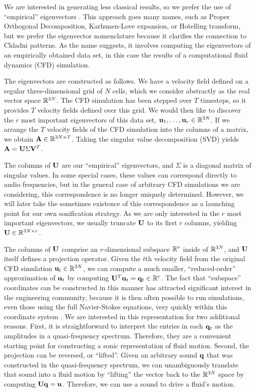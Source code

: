 \documentclass[11pt]{article}
\begin{document}
We are interested in generating less classical results, so we prefer the use of ``empirical'' eigenvectors \cite{Ryckelynck2005}. This approach goes many names, such as Proper Orthogonal Decomposition, Karhunen-Love expansion, or Hotelling transform, but we prefer the eigenvector nomenclature because it clarifies the connection to Chladni patterns. As the name suggests, it involves computing the eigenvectors of an empirically obtained data set, in this case the results of a computational fluid dynamics (CFD) simulation.

The eigenvectors are constructed as follows. We have a velocity field defined on a regular three-dimensional grid of $N$ cells, which we consider abstractly as the real vector space $\mathbb{R}^{3N}$. The CFD simulation has been stepped over $T$ timesteps, so it provides $T$ velocity fields defined over this grid. We would then like to discover the $r$ most important eigenvectors of this data set, $\mathbf{u}_1, \ldots, \mathbf{u}_r \in \mathbb{R}^{3N}$. If we arrange the $T$ velocity fields of the CFD simulation into the columns of a matrix, we obtain $\mathbf{A} \in \mathbb{R}^{3N \times T}$. Taking the singular value decomposition (SVD) yields $\mathbf{A} = \mathbf{U} \Sigma \mathbf{V}^T$.

The columns of $\mathbf{U}$ are our ``empirical'' eigenvectors, and $\Sigma$ is a diagonal matrix of singular values. In some special cases, these values can correspond directly to audio frequencies, but in the general case of arbitrary CFD simulations we are considering, this correspondence is no longer uniquely determined. However, we will later take the sometimes existence of this correspondence as a launching point for our own sonification strategy. As we are only interested in the $r$ most important eigenvectors, we usually truncate $\mathbf{U}$ to its first $r$ columns, yielding $\mathbf{U} \in \mathbb{R}^{3N \times r}$.

The columns of $\mathbf{U}$ comprise an $r$-dimensional subspace $\mathbb{R}^r$ inside of $\mathbb{R}^{3N}$, and $\mathbf{U}$ itself defines a projection operator. Given the $t$th velocity field from the original CFD simulation $\mathbf{u}_t \in \mathbb{R}^{3N}$, we can compute a much smaller, ``reduced-order'' approximation of $\mathbf{u}_t$ by computing $\mathbf{U}^T \mathbf{u}_t = \mathbf{q}_t \in \mathbb{R}^r$. The fact that ``subspace'' coordinates can be constructed in this manner has attracted significant interest in the engineering community, because it is then often possible to run simulations, even those using the full Navier-Stokes equations, very quickly within this coordinate system \cite{Kim2013}. We are interested in this representation for two additional reasons. First, it is straightforward to interpret the entries in each $\mathbf{q}_t$ as the amplitudes in a quasi-frequency spectrum. Therefore, they are a convenient starting point for constructing a sonic representation of fluid motion. Second, the projection can be reversed, or ``lifted''. Given an arbitrary sound $\mathbf{q}$ that was constructed in the quasi-frequency spectrum, we can unambiguously translate that sound into a fluid motion by ``lifting'' the vector back to the $\mathbb{R}^{3N}$ space by computing $\mathbf{U} \mathbf{q} = \mathbf{u}$. Therefore, we can use a sound to drive a fluid's motion.
\end{document}
